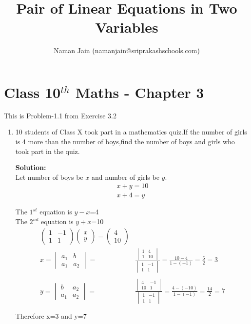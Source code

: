 \documentclass[10pt]{article}
\title{Pair of Linear Equations in Two Variables}
\author{Naman Jain  (namanjain@sriprakashschools.com)}
\newcommand{\myvec}[1]{\ensuremath{\begin{pmatrix}#1\end{pmatrix}}}
\newcommand{\mydet}[1]{\ensuremath{\begin{vmatrix}#1\end{vmatrix}}}
\newcommand{\solution}{\noindent \textbf{Solution: }}
\begin{document}
\maketitle
\section*{Class 10$^{th}$ Maths - Chapter 3}
This is Problem-1.1 from Exercise 3.2
\begin{enumerate}
\item 10 students of Class X took part in a mathematics quiz.If the number of girls is 4 more than the number of boys,find the number of boys and girls who took part in the quiz.
	
\solution \\
Let number of boys be $x$ and number of girls be $y$.\\
\begin{align}
x+y=10\\
x+4=y
\end{align}

The $1^{st}$ equation is $y-x$=4\\
The $2^{nd}$ equation is $y+x$=10\\
\begin{align}
\myvec{1&-1\\1&1} \myvec{x\\y}=\myvec{4\\10}\\
x=\mydet{ a_1 & b\\a_1 & a_2} =&
\frac{\mydet{ 1 & 4\\1 & 10}}{\mydet{ 1 & -1\\1 & 1}}
=\frac{10-4}{1-(-1)}
=\frac{6}{2}
=3 \\ \\
y=\mydet{ b & a_2\\a_1 & a_2} =&
\frac{\mydet{ 4 & -1\\10 & 1}}{\mydet{ 1 & -1\\1 & 1}}
=\frac{4-(-10)}{1-(-1)}
=\frac{14}{2}
=7\\ \\
\end{align}
Therefore  x=3 and y=7
\end{enumerate}
\end{document}
